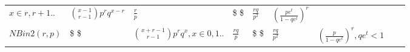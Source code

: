 \documentclass[]{tufte-book}
\begin{document}
\begin{longtable}[]{@{}lllllllll@{}}
\begin{minipage}[t]{0.08\columnwidth}
\(x\in r,r+1..\)\strut
\end{minipage} & \begin{minipage}[t]{0.08\columnwidth}\raggedright
\(\binom{x-1}{r-1}p^rq^{x-r}\)\strut
\end{minipage} & \begin{minipage}[t]{0.08\columnwidth}\raggedright
\(\frac{r}p\)\strut
\end{minipage} & \begin{minipage}[t]{0.08\columnwidth}\raggedright
\$ \$\strut
\end{minipage} & \begin{minipage}[t]{0.08\columnwidth}\raggedright
\(\frac{rq}{p^2}\)\strut
\end{minipage} & \begin{minipage}[t]{0.08\columnwidth}\raggedright
\((\frac{pe^t}{1-qe^t})^r\)\strut
\end{minipage} & \begin{minipage}[t]{0.08\columnwidth}\raggedright
\strut
\end{minipage} & \begin{minipage}[t]{0.08\columnwidth}\raggedright
\strut
\end{minipage}\tabularnewline
\begin{minipage}[t]{0.08\columnwidth}\raggedright
\(NBin2(r,p)\)\strut
\end{minipage} & \begin{minipage}[t]{0.08\columnwidth}\raggedright
\$ \$\strut
\end{minipage} & \begin{minipage}[t]{0.08\columnwidth}\raggedright
\(\binom{x+r-1}{r-1}p^rq^x, x \in 0,1..\)\strut
\end{minipage} & \begin{minipage}[t]{0.08\columnwidth}\raggedright
\(\frac{rq}p\)\strut
\end{minipage} & \begin{minipage}[t]{0.08\columnwidth}\raggedright
\$ \$\strut
\end{minipage} & \begin{minipage}[t]{0.08\columnwidth}\raggedright
\(\frac{rq}{p^2}\)\strut
\end{minipage} & \begin{minipage}[t]{0.08\columnwidth}\raggedright
\((\frac{p}{1-qe^t})^r, qe^t<1\)\strut
\end{minipage} & \begin{minipage}[t]{0.08\columnwidth}\raggedright
\strut
\end{minipage} & \begin{minipage}[t]{0.08\columnwidth}\raggedright

\end{minipage}
\end{longtable}
\end{document}
